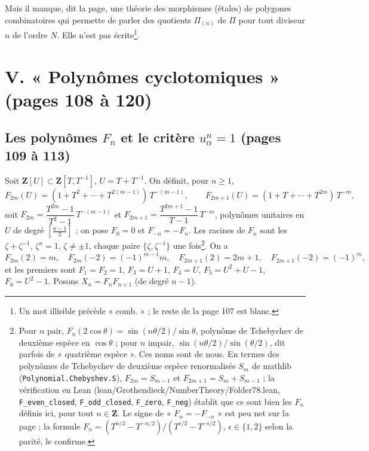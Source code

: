\documentclass[11pt,a4paper]{article}
\begin{document}
Mais il manque, dit la page, une théorie des morphismes (étales) de polygones
combinatoires qui permette de parler des quotients $\Pi_{(n)}$ de $\Pi$ pour
tout diviseur $n$ de l'ordre $N$. Elle n'est pas écrite\footnote{Un mot
illisible précède « comb. » ; le reste de la page 107 est blanc.}.

\section*{V. « Polynômes cyclotomiques » (pages 108 à 120)}

\subsection*{Les polynômes $F_n$ et le critère $u_\alpha^n = 1$ (pages 109 à 113)}

Soit $\mathbf{Z}[U] \subset \mathbf{Z}[T, T^{-1}]$, $U = T + T^{-1}$. On
définit, pour $n \geq 1$,
\[
  F_{2m}(U) = (1 + T^2 + \cdots + T^{2(m-1)})\, T^{-(m-1)}, \qquad
  F_{2m+1}(U) = (1 + T + \cdots + T^{2m})\, T^{-m} ,
\]
soit $F_{2m} = \dfrac{T^{2m} - 1}{T^2 - 1}\, T^{-(m-1)}$ et $F_{2m+1} =
\dfrac{T^{2m+1} - 1}{T - 1}\, T^{-m}$, polynômes unitaires en $U$ de degré
$[\frac{n-1}2]$ ; on pose $F_0 = 0$ et $F_{-n} = -F_n$. Les racines de $F_n$
sont les $\zeta + \zeta^{-1}$, $\zeta^n = 1$, $\zeta \neq \pm 1$, chaque paire
$\{\zeta, \zeta^{-1}\}$ une fois\footnote{Pour $n$ pair, $F_n(2\cos\theta) =
\sin(n\theta/2)/\sin\theta$, polynôme de Tchebychev de deuxième espèce en
$\cos\theta$ ; pour $n$ impair, $\sin(n\theta/2)/\sin(\theta/2)$, dit parfois
de « quatrième espèce ». Ces noms sont de nous. En termes des polynômes de
Tchebychev de deuxième espèce renormalisés $S_m$ de mathlib
(\texttt{Polynomial.Chebyshev.S}), $F_{2m} = S_{m-1}$ et
$F_{2m+1} = S_m + S_{m-1}$ ; la vérification en Lean
(lean/Grothendieck/NumberTheory/Folder78.lean, \texttt{F\_even\_closed},
\texttt{F\_odd\_closed}, \texttt{F\_zero}, \texttt{F\_neg}) établit que ce
sont bien les $F_n$ définis ici, pour tout $n \in \mathbf{Z}$. Le signe de « $F_n = -F_{-n}$ »
est peu net sur la page ; la formule
$F_n = (T^{n/2} - T^{-n/2})/(T^{\epsilon/2} - T^{-\epsilon/2})$,
$\epsilon \in \{1, 2\}$ selon la parité, le confirme.}. On a
\[
  F_{2m}(2) = m, \quad F_{2m}(-2) = (-1)^{m-1} m, \quad F_{2m+1}(2) = 2m + 1,
  \quad F_{2m+1}(-2) = (-1)^m ,
\]
et les premiers sont $F_1 = F_2 = 1$, $F_3 = U + 1$, $F_4 = U$, $F_5 = U^2 + U
- 1$, $F_6 = U^2 - 1$. Posons $X_n = F_n F_{n+1}$ (de degré $n - 1$).
\end{document}
